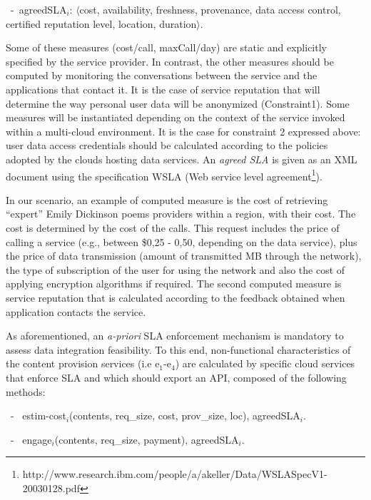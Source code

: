 
\begin{trivlist}\sf\footnotesize
\item[~-~agreedSLA$_i$:] $\langle$cost, availability, freshness, provenance, data access control, certified reputation level, location, duration$\rangle$. 
 \end{trivlist}
 
Some of these measures ({cost/call, maxCall/day}) are static and explicitly specified by the service provider. 
In contrast, the other measures should be computed by monitoring the conversations between the service and the applications that contact it.  It is the case of service reputation that will determine the way personal user data will be anonymized (Constraint1).  Some measures will be instantiated depending on the context of  the service invoked within a multi-cloud environment. It is the case for constraint 2 expressed above:   user data access credentials should be calculated according to the policies adopted by the clouds  hosting  data services.
An \textit{agreed SLA} is given as an  XML document using the specification WSLA (Web service level agreement\footnote{\footnotesize http://www.research.ibm.com/people/a/akeller/\-Data/WSLASpecV1-20030128.pdf}).

In our scenario, an example of computed measure is the cost of retrieving ``expert'' Emily Dickinson poems providers within a region, with their cost. 
The cost is determined by the  cost of the calls. 
This request  includes the price of calling a service (e.g.,  between \$0,25 - 0,50, depending on the data service), plus the price of data transmission (amount of transmitted MB through the network), the type of subscription of the user for using the network and also the cost of applying encryption algorithms if required. 
The second computed measure is service reputation that is calculated according to the feedback obtained when application contacts the service.


As aforementioned, an \textit{a-priori} SLA enforcement mechanism is mandatory to assess data integration feasibility.
To this end, non-functional characteristics of the content provision services ({i.e e$_1$-e$_4$}) are calculated by specific cloud services that enforce SLA and which should export  an API, composed of the following methods:

 
\begin{trivlist}\sf\footnotesize
\item[~-~]estim-cost$_i$(contents, req\_size, cost, prov\_size, loc), 
agreedSLA$_i$.

\item[~-~]engage$_i$(contents, req\_size, payment), agreedSLA$_i$.
\end{trivlist}

